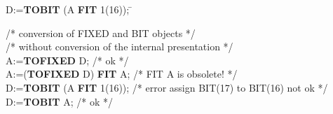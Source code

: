 \begin{tabbing}
D:={\bf TOBIT} (A {\bf FIT} 1(16)); \x \= \kill

/* conversion of FIXED and BIT objects  */ \\
/* without conversion of the internal presentation */ \\
A:={\bf TOFIXED} D; \> /* ok */\\
A:=({\bf TOFIXED} D) {\bf FIT} A; \> /* FIT A is obsolete! */\\
D:={\bf TOBIT} (A {\bf FIT} 1(16));  \> /* error assign BIT(17) to BIT(16) not ok */  \\
D:={\bf TOBIT} A;    \> /* ok */
\end{tabbing}


